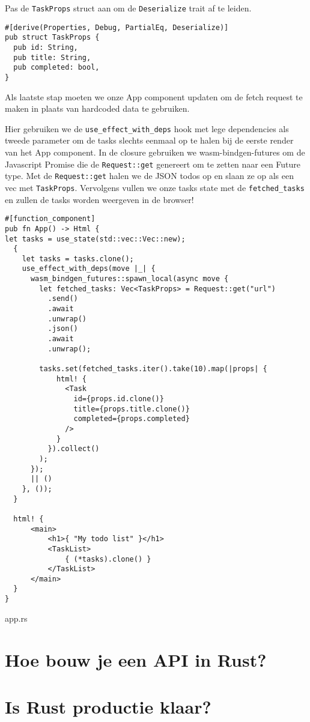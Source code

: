 Pas de \texttt{TaskProps} struct aan om de \texttt{Deserialize} trait af te leiden.

\begin{verbatim}
#[derive(Properties, Debug, PartialEq, Deserialize)]
pub struct TaskProps {
  pub id: String,
  pub title: String,
  pub completed: bool,
}
\end{verbatim}

Als laatste stap moeten we onze App component updaten om de fetch request te maken in plaats van
hardcoded data te gebruiken.

Hier gebruiken we de \texttt{use_effect_with_deps} hook met lege dependencies als tweede parameter om de
tasks slechts eenmaal op te halen bij de eerste render van het App component. In de closure
gebruiken we wasm-bindgen-futures om de Javascript Promise die de \texttt{Request::get} genereert om te
zetten naar een Future type. Met de \texttt{Request::get} halen we de JSON todos op en slaan ze op als een
vec met \texttt{TaskProps}. Vervolgens vullen we onze tasks state met de
\texttt{fetched_tasks} en zullen de tasks
worden weergeven in de browser!

\begin{listing}
\begin{verbatim}
#[function_component]
pub fn App() -> Html {
let tasks = use_state(std::vec::Vec::new);
  {
    let tasks = tasks.clone();
    use_effect_with_deps(move |_| {
      wasm_bindgen_futures::spawn_local(async move {
        let fetched_tasks: Vec<TaskProps> = Request::get("url")
          .send()
          .await
          .unwrap()
          .json()
          .await
          .unwrap();

        tasks.set(fetched_tasks.iter().take(10).map(|props| {
            html! { 
              <Task 
                id={props.id.clone()} 
                title={props.title.clone()} 
                completed={props.completed} 
              /> 
            }
          }).collect()
        );
      });
      || ()
    }, ());
  }

  html! {
      <main>
          <h1>{ "My todo list" }</h1>
          <TaskList>
              { (*tasks).clone() }
          </TaskList>
      </main>
  }
}
\end{verbatim}
\caption{app.rs}
\end{listing}

\clearpage


\section{Hoe bouw je een API in Rust?}

\section{Is Rust productie klaar?}
